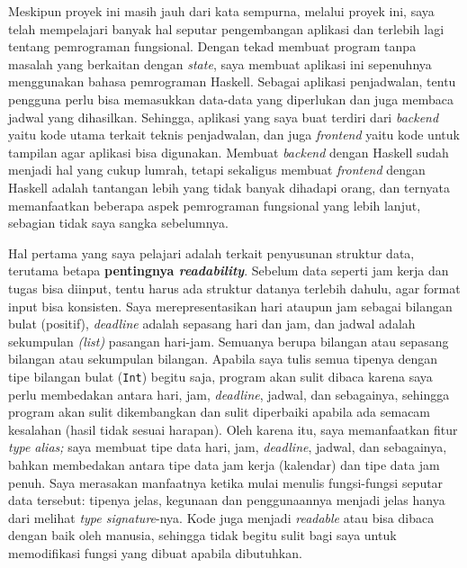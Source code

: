 \documentclass{article}
\begin{document}
Meskipun proyek ini masih jauh dari kata sempurna, melalui proyek ini, saya telah mempelajari banyak hal seputar pengembangan aplikasi dan terlebih lagi tentang pemrograman fungsional. Dengan tekad membuat program tanpa masalah yang berkaitan dengan \textit{state}, saya membuat aplikasi ini sepenuhnya menggunakan bahasa pemrograman Haskell. Sebagai aplikasi penjadwalan, tentu pengguna perlu bisa memasukkan data-data yang diperlukan dan juga membaca jadwal yang dihasilkan. Sehingga, aplikasi yang saya buat terdiri dari \textit{backend} yaitu kode utama terkait teknis penjadwalan, dan juga \textit{frontend} yaitu kode untuk tampilan agar aplikasi bisa digunakan. Membuat \textit{backend} dengan Haskell sudah menjadi hal yang cukup lumrah, tetapi sekaligus membuat \textit{frontend} dengan Haskell adalah tantangan lebih yang tidak banyak dihadapi orang, dan ternyata memanfaatkan beberapa aspek pemrograman fungsional yang lebih lanjut, sebagian tidak saya sangka sebelumnya.

Hal pertama yang saya pelajari adalah terkait penyusunan struktur data, terutama betapa \textbf{pentingnya \textit{readability}}. Sebelum data seperti jam kerja dan tugas bisa diinput, tentu harus ada struktur datanya terlebih dahulu, agar format input bisa konsisten. Saya merepresentasikan hari ataupun jam sebagai bilangan bulat (positif), \textit{deadline} adalah sepasang hari dan jam, dan jadwal adalah sekumpulan \textit{(list)} pasangan hari-jam. Semuanya berupa bilangan atau sepasang bilangan atau sekumpulan bilangan. Apabila saya tulis semua tipenya dengan tipe bilangan bulat (\verb|Int|) begitu saja, program akan sulit dibaca karena saya perlu membedakan antara hari, jam, \textit{deadline}, jadwal, dan sebagainya, sehingga program akan sulit dikembangkan dan sulit diperbaiki apabila ada semacam kesalahan (hasil tidak sesuai harapan). Oleh karena itu, saya memanfaatkan fitur \textit{type alias;} saya membuat tipe data hari, jam, \textit{deadline}, jadwal, dan sebagainya, bahkan membedakan antara tipe data jam kerja (kalendar) dan tipe data jam penuh. Saya merasakan manfaatnya ketika mulai menulis fungsi-fungsi seputar data tersebut: tipenya jelas, kegunaan dan penggunaannya menjadi jelas hanya dari melihat \textit{type signature}-nya. Kode juga menjadi \textit{readable} atau bisa dibaca dengan baik oleh manusia, sehingga tidak begitu sulit bagi saya untuk memodifikasi fungsi yang dibuat apabila dibutuhkan.
\end{document}
